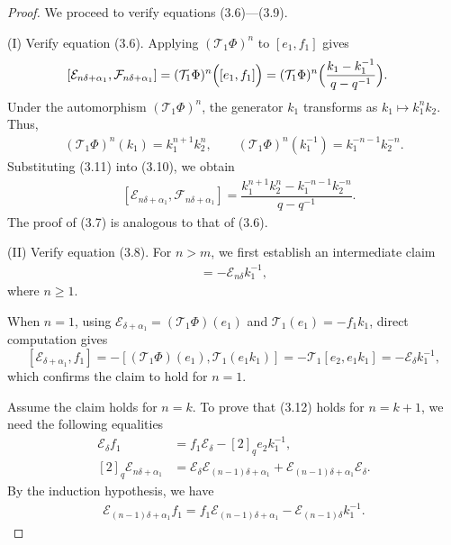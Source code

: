 \documentclass[12pt]{amsart}
\numberwithin{equation}{section}
\numberwithin{equation}{section}
\begin{document}
\begin{proof}
We proceed to verify equations (3.6)---(3.9).

(I) Verify equation (3.6). Applying \((\mathcal{T}_1\Phi)^n\) to  \([e_1, f_1]\) gives
\begin{align}
&[\mathcal{E}_{n\delta+\alpha_1}, \mathcal{F}_{n\delta+\alpha_1}] = (\mathcal{T}_1\Phi)^n\Bigl([e_1, f_1]\Bigr)=(\mathcal{T}_1\Phi)^n\Bigl(\dfrac{k_1 - k_1^{-1}}{q - q^{-1}}\Bigr).
\end{align}
Under the automorphism \((\mathcal{T}_1\Phi)^n\), the generator \(k_1\) transforms as \(k_1 \mapsto k_1^nk_2\). Thus,
\begin{align}
(\mathcal{T}_1\Phi)^n(k_1) = k_1^{n+1}k_2^n, \qquad (\mathcal{T}_1\Phi)^n(k_1^{-1}) = k_1^{-n-1}k_2^{-n}.
\end{align}
Substituting (3.11) into (3.10), we obtain
\begin{align*}
&[\mathcal{E}_{n\delta+\alpha_1}, \mathcal{F}_{n\delta+\alpha_1}] = \dfrac{k_1^{n+1}k_2^n - k_1^{-n-1}k_2^{-n}}{q - q^{-1}}.
\end{align*}
The proof of (3.7) is analogous to that of (3.6).

(II) Verify equation (3.8).
For \(n > m\), we first establish an intermediate claim
\begin{align}
[\mathcal{E}_{n\delta+\alpha_1}, f_1] = -\mathcal{E}_{n\delta}k_1^{-1},
\end{align}
where \(n\ge 1\).

When \(n = 1\), using \(\mathcal{E}_{\delta+\alpha_1} = (\mathcal{T}_1\Phi)(e_1)\) and \(\mathcal{T}_1(e_1) = -f_1k_1\), direct computation gives
\[
[\mathcal{E}_{\delta+\alpha_1}, f_1] = -[(\mathcal{T}_1\Phi)(e_1), \mathcal{T}_1(e_1k_1)] =  -\mathcal{T}_1[e_2, e_1k_1]=
-\mathcal{E}_{\delta}k_1^{-1},
\]
which confirms the claim to hold for \(n = 1\).

Assume the claim holds for \(n = k\). To prove that (3.12) holds for \(n = k+1\), we need the following equalities
\begin{align}
\mathcal{E}_{\delta}f_1 &= f_1\mathcal{E}_{\delta} - [2]_qe_2k_1^{-1},\\
[2]_q\mathcal{E}_{n\delta+\alpha_1} &= \mathcal{E}_{\delta}\mathcal{E}_{(n-1)\delta+\alpha_1} + \mathcal{E}_{(n-1)\delta+\alpha_1}\mathcal{E}_{\delta}.
\end{align}
By the induction hypothesis, we have 
\begin{align}
\mathcal{E}_{(n-1)\delta+\alpha_1}f_1 = f_1\mathcal{E}_{(n-1)\delta+\alpha_1} - \mathcal{E}_{(n-1)\delta}k_1^{-1}.
\end{align}


\end{proof}
\end{document}
